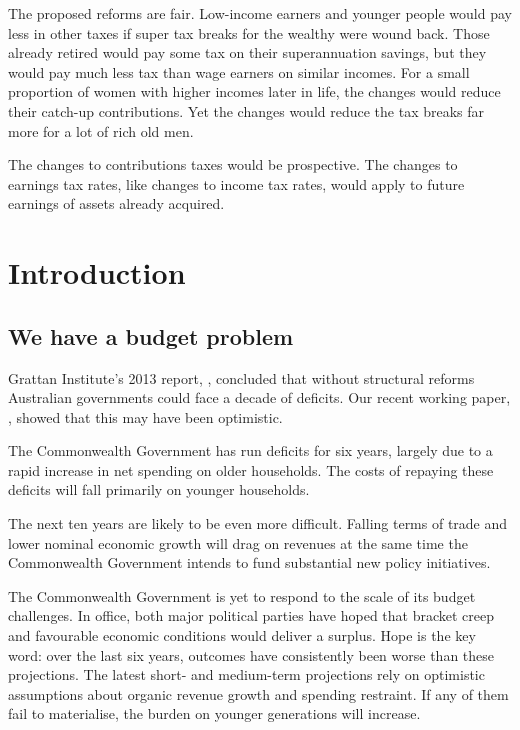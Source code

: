 \documentclass{grattanAlpha}
\begin{document}
\begin{overview}[-25pt]
The proposed reforms are fair. Low-income earners and younger people would pay less in other taxes if super tax breaks for the wealthy were wound back. Those already retired would pay some tax on their superannuation savings, but they would pay much less tax than wage earners on similar incomes. For a small proportion of women with higher incomes later in life, the changes would reduce their catch-up contributions. Yet the changes would reduce the tax breaks far more for a lot of rich old men. 

The changes to contributions taxes would be prospective. The changes to earnings tax rates, like changes to income tax rates, would apply to future earnings of assets already acquired.

\end{overview}
\addtolength{\columnsep}{-\overviewextra}
\contentspage

\chapter{Introduction}
\section{We have a budget problem}
Grattan Institute’s 2013 report, , concluded that without structural reforms Australian governments could face a decade of deficits.  Our recent working paper, , showed that this may have been optimistic. 

The Commonwealth Government has run deficits for six years, largely due to a rapid increase in net spending on older households. The costs of repaying these deficits will fall primarily on younger households.

The next ten years are likely to be even more difficult. Falling terms of trade and lower nominal economic growth will drag on revenues at the same time the Commonwealth Government intends to fund substantial new policy initiatives.

The Commonwealth Government is yet to respond to the scale of its budget challenges. In office, both major political parties have hoped that bracket creep and favourable economic conditions would deliver a surplus. Hope is the key word: over the last six years, outcomes have consistently been worse than these projections. The latest short- and medium-term projections rely on optimistic assumptions about organic revenue growth and spending restraint. If any of them fail to materialise, the burden on younger generations will increase.
\end{document}
